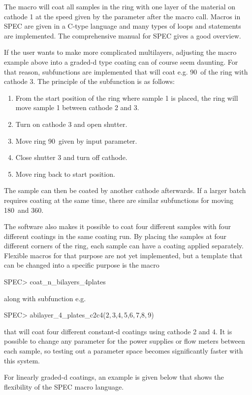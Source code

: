 The macro will coat all samples in the ring with one layer of the material on cathode 1 at the speed given by the parameter after the macro call. Macros in SPEC are given in a C-type language and many types of loops and statements are implemented. The comprehensive manual for SPEC gives a good overview.

If the user wants to make more complicated multilayers, adjusting the macro example above into a graded-d type coating can of course seem daunting. For that reason, subfunctions are implemented that will coat e.g. 90\degr\ of the ring with cathode 3. The principle of the subfunction is as follows:

\begin{enumerate}
  \item From the start position of the ring where sample 1 is placed, the ring will move sample 1 between cathode 2 and 3.
  \item Turn on cathode 3 and open shutter.
  \item Move ring 90\degr\ given by input parameter.
  \item Close shutter 3 and turn off cathode.
  \item Move ring back to start position.
\end{enumerate}

The sample can then be coated by another cathode afterwards. If a larger batch requires coating at the same time, there are similar subfunctions for moving 180\degr\ and 360\degr.

The software also makes it possible to coat four different samples with four different coatings in the same coating run. By placing the samples at four different corners of the ring, each sample can have a coating applied separately. Flexible macros for that purpose are not yet implemented, but a template that can be changed into a specific purpose is the macro
\begin{verbcode}
  SPEC> coat_n_bilayers_4plates
\end{verbcode}
along with subfunction e.g.
\begin{verbcode}
  SPEC> abilayer_4_plates_c2c4($2,$3,$4,$5,$6,$7,$8,$9)
\end{verbcode}
that will coat four different constant-d coatings using cathode 2 and 4. It is possible to change any parameter for the power supplies or flow meters between each sample, so testing out a parameter space becomes significantly faster with this system.

For linearly graded-d coatings, an example is given below that shows the flexibility of the SPEC macro language.

